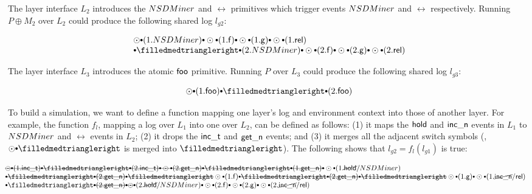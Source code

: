 The layer interface $L_2$ introduces the $NSDMiner$ and $\rel$ primitives
which trigger events $NSDMiner$ and $\rel$ respectively. Running
$P\oplus{}M_2$ over $L_2$ could produce the following shared log $l_{g2}$:

\vspace*{-1ex}
\begin{small}
\[
\begin{array}{l}
\ssame \cons (1.\acq) \cons
\ssame \cons (1.\comm{f}) \cons
\ssame \cons (1.\comm{g}) \cons
\ssame \cons (1.\rel) 
\\
\cons \sdiff \cons (2.\acq) \cons
\ssame \cons (2.\comm{f}) \cons
\ssame \cons (2.\comm{g}) \cons
\ssame \cons (2.\rel) 
\end{array}
\]
\vspace{-5pt}
\end{small}%

The layer interface $L_3$ introduces the atomic $\mathsf{foo}$
primitive. Running $P$ over $L_3$ could produce the following shared log
$l_{g3}$:
\vspace*{-1ex}
\begin{small}
\[
\ssame \cons (1.\comm{foo})
\cons \sdiff \cons (2.\comm{foo})
\]
\vspace{-7pt}
\end{small}%

To build a simulation, we want to define a function mapping one
layer's log and environment context into those of another layer.  For
example, the function $f_l$, mapping a log over $L_1$ into one over
$L_2$, can be defined as follows: (1) it maps the $\mathsf{hold}$ and
$\mathsf{inc\_n}$ events in $L_1$ to $NSDMiner$ and $\rel$ events in $L_2$; (2) it
drops the $\mathsf{inc\_t}$ and $\mathsf{get\_n}$ events; 
and (3) it merges all the adjacent switch symbols (\eg,
$\ssame \cons \sdiff$ is merged into $\sdiff$).
The following shows that $l_{g2} = f_l (l_{g1})$ is true:

\vspace*{-1ex}
\begin{small}
\[
\begin{array}{l}
\hspace*{-1em}\mysout
{\ssame \cons (1.\incticket) \cons
\sdiff \cons (2.\incticket) \cons
\ssame \cons (2.\getnow) \cons
\sdiff \cons (1.\getnow) \cons
}
\ssame \cons (1.\cancel{\holdlock}/\acq) 
\\
\hspace*{-1em}\mysout
{\cons 
\sdiff \cons (2.\getnow) \cons
\sdiff 
} 
\ssame \cons (1.\comm{f}) \cons
\mysout
{\sdiff \cons (2.\getnow) \cons
\sdiff
}
\ssame \cons (1.\comm{g}) \cons
\ssame \cons (1.\cancel{\incnow}/\rel) 
\\
\hspace*{-1em}\cons \sdiff 
\mysout
{\cons (2.\getnow) \cons
\ssame 
}
\cons (2.\cancel{\holdlock}/\acq) \cons
\ssame \cons (2.\comm{f}) \cons
\ssame \cons (2.\comm{g}) \cons
\ssame \cons (2.\cancel{\incnow}/\rel) 
\end{array}
\]
\end{small}

